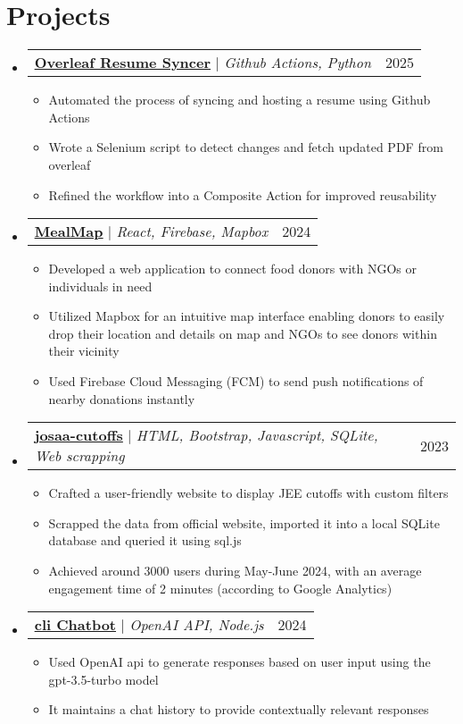 \documentclass[letterpaper,11pt]{article}
\makeatletter
\newcommand{\resumeItem}[1]{
  \item\small{
    {#1 \vspace{-5pt}}
  }
}
\newcommand{\resumeProjectHeading}[2]{
    \item
    \begin{tabular*}{0.97\textwidth}{l@{\extracolsep{\fill}}r}
      \small#1 & #2 \\
    \end{tabular*}\vspace{0pt}
}
\newcommand{\resumeSubHeadingListStart}{\begin{itemize}[leftmargin=0.15in, label={}]}
\newcommand{\resumeSubHeadingListEnd}{\end{itemize}}
\newcommand{\resumeItemListStart}{\begin{itemize}}
\newcommand{\resumeItemListEnd}{\end{itemize}\vspace{3pt}}
\makeatother
\begin{document}
\section{Projects}
    \resumeSubHeadingListStart
        \resumeProjectHeading
          {\textbf{\href{https://github.com/Sbrjt/overleaf-resume-downloader}{\href{}{\underline{Overleaf Resume Syncer}}}}  $|$ \emph{Github Actions, Python}}{2025}
          \resumeItemListStart
            \resumeItem{Automated the process of syncing and hosting a resume using Github Actions}
            \resumeItem{Wrote a Selenium script to detect changes and fetch updated PDF from overleaf}
            \resumeItem{Refined the workflow into a Composite Action for improved reusability}
          \resumeItemListEnd
        \resumeProjectHeading
          {\textbf{\href{https://github.com/Sbrjt/MealMap}{\href{}{\underline{MealMap}}}}  $|$ \emph{React, Firebase, Mapbox}}{2024}
          \resumeItemListStart
            \resumeItem{Developed a web application to connect food donors with NGOs or individuals in need}
            \resumeItem{Utilized Mapbox for an intuitive map interface enabling donors to easily drop their location and details on map and NGOs to see donors within their vicinity}
            \resumeItem{Used Firebase Cloud Messaging (FCM) to send push notifications of nearby donations instantly}
          \resumeItemListEnd
        \resumeProjectHeading
          {\textbf{\href{https://github.com/Sbrjt/josaa-cutoffs}{\href{}{\underline{josaa-cutoffs}}}} $|$ \emph{HTML, Bootstrap, Javascript, SQLite, Web scrapping}}{2023}
          \resumeItemListStart
            \resumeItem{Crafted a user-friendly website to display JEE cutoffs with custom filters}
            \resumeItem{Scrapped the data from official website, imported it into a local SQLite database and queried it using sql.js}
            \resumeItem{Achieved around 3000 users during May-June 2024, with an average engagement time of 2 minutes (according to Google Analytics)}
          \resumeItemListEnd
          
        \resumeProjectHeading
          {\textbf{\href{https://github.com/Sbrjt/Chatbot}{\href{}{\underline{cli Chatbot}}}}  $|$ \emph{OpenAI API, Node.js}}{2024}
          \resumeItemListStart
            \resumeItem{Used OpenAI api to generate responses based on user input using the gpt-3.5-turbo model}
            \resumeItem{It maintains a chat history to provide contextually relevant responses}
          \resumeItemListEnd
    \resumeSubHeadingListEnd
\end{document}
